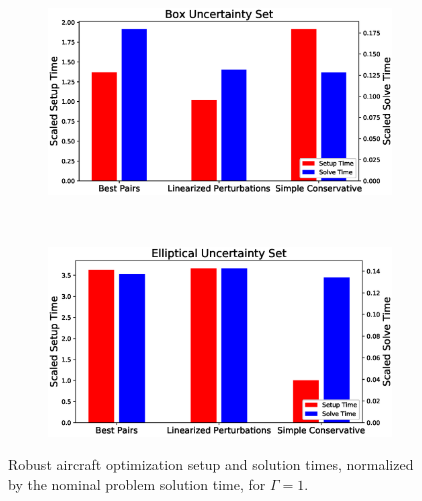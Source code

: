 \begin{figure}[h!]
    \centering
    \captionsetup{justification=centering, font=small}
    \begin{subfigure}{0.49\textwidth}
        \centering
        \includegraphics[width=\linewidth]{box_sst.eps}
    \end{subfigure}
    ~
    \begin{subfigure}{0.49\textwidth}
        \centering
        \includegraphics[width=\linewidth]{ell_sst.eps}
    \end{subfigure}
    \caption{Robust aircraft optimization setup and solution times, normalized by the
    nominal problem solution time, for $\Gamma = 1$.}
    \label{compare_signomial}
\end{figure}

